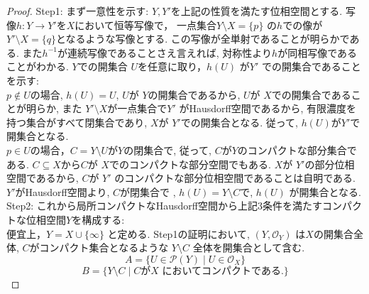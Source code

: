 \documentclass[lualatex]{ltjsbook}
\theoremstyle{remark}
\theoremstyle{plain}
\begin{document}
\begin{proof}
	Step1: まず一意性を示す: $Y,Y'$を上記の性質を満たす位相空間とする. 
	写像$h: Y \to Y'$を$X$において恒等写像で， 
	一点集合$Y\setminus X = \{p\} $ の$h$での像が
	$Y' \setminus X = \{q\} $となるような写像とする.
	この写像が全単射であることが明らかである. 
	また$h^{-1}$が連続写像であることさえ言えれば,
	対称性より$h$が同相写像であることがわかる. 
	$Y$での開集合 $U$を任意に取り，$h\left( U \right) $ が$Y'$ での開集合であることを示す:\\
	$ p \not\in U$の場合, $h(U) =U$, $U$が $Y$の開集合であるから,  
	$U$が $X$での開集合であることが明らか, 
	また $Y ' \setminus X$が一点集合で$Y '$ がHausdorff空間であるから, 有限濃度を持つ集合がすべて閉集合であり,
	$X$が $Y'$での開集合となる. 従って, $h\left( U \right) $が$Y'$で開集合となる.\\
	$p \in U$の場合，$C = Y \setminus U$が$Y$の閉集合で, 
	従って, $C$が$Y$のコンパクトな部分集合である.
	$C \subseteq X$から$C$が $X$でのコンパクトな部分空間でもある. 
	$X$が $Y'$の部分位相空間であるから,  $C $が $Y'$ のコンパクトな部分位相空間であることは自明である.
	$Y'$がHausdorff空間より,  $C$が閉集合で , $ h\left( U \right)  = Y \setminus C$で, $h\left( U \right) $ が開集合となる.\\
	Step2: これから局所コンパクトなHausdorff空間から上記3条件を満たすコンパクトな位相空間$Y$を構成する:\\
	 便宜上，$Y = X \cup \{ \infty \} $ と定める. Step1の証明において,  $\left( Y , \mathcal{O}_{Y} \right)$ は$X$の開集合全体, $C$がコンパクト集合となるような $Y \setminus C$ 全体を開集合として含む. 
	 $$
		 A = \{U \in \mathcal{P}(Y)  \mid  U \in \mathcal{O}_X \} 
		 $$
		 $$
		 B= \{Y \setminus C  \mid \text{$C$が$X$ においてコンパクトである.}\}  
		 $$


\end{proof}
\end{document}
